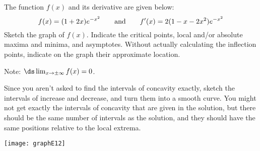 
\begin{question}[1997D]\label{s3.6.6expfirst}
The function $f(x)$ and its derivative are given below:
\[
f(x)=(1+2x)e^{-x^2}\qquad\hbox{and}\qquad f'(x)=2(1-x-2x^2)e^{-x^2}
\]
Sketch the graph of $f(x)$. Indicate the critical points, local
and/or absolute maxima and minima, and asymptotes. Without actually calculating
the inflection points, indicate on the graph their approximate location.

Note: $\ds\lim_{x \to \pm\infty}f(x)=0$.
\end{question}
\begin{hint}
Since you aren't asked to find the intervals of concavity exactly, sketch the intervals of increase and decrease, and turn them into a smooth curve. You might not get exactly the intervals of concavity that are given in the solution, but there should be the same number of intervals as the solution, and they should have the same positions relative to the local extrema.
\end{hint}
\begin{answer}\begin{center}\texttt{[image: graphE12]}\end{center}
\end{answer}
